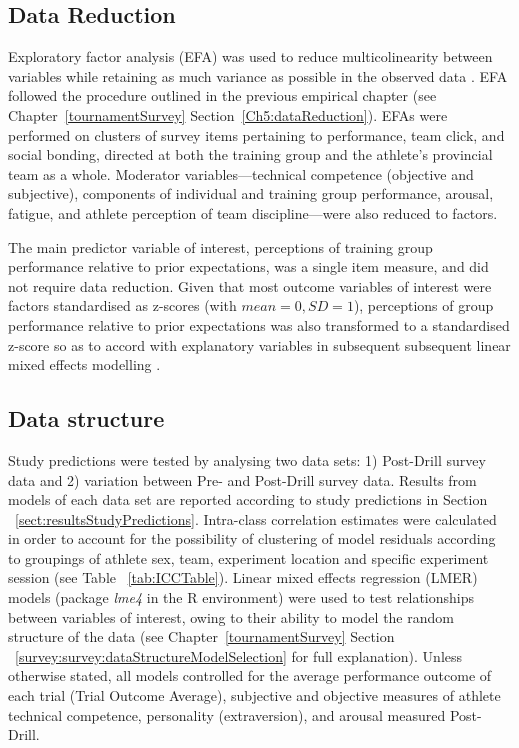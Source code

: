 \subsection{Data Reduction}
Exploratory factor analysis (EFA) was used to reduce multicolinearity between variables while retaining as much variance as possible in the observed data \citep[, see Appendix~\ref{app5:EFA}]{Yong2013}. EFA followed the procedure outlined in the previous empirical chapter (see Chapter~\ref{tournamentSurvey} Section~\ref{Ch5:dataReduction}).
EFAs were performed on clusters of survey items pertaining to performance, team click, and social bonding, directed at both the training group and the athlete's provincial team as a whole.  Moderator variables---technical competence (objective and subjective), components of individual and training group performance, arousal, fatigue, and athlete perception of team discipline---were also reduced to factors.


The main predictor variable of interest, perceptions of training group performance relative to prior expectations, was a single item measure, and did not require data reduction.  Given that most outcome variables of interest were factors standardised as z-scores (with $mean = 0, SD = 1$), perceptions of group performance relative to prior expectations was also transformed to a standardised z-score so as to accord with explanatory variables in subsequent subsequent linear mixed effects modelling \citep[for an explanation, see, for example, ][1058]{Beckmann2003}.


\subsection{Data structure}
Study predictions were tested by analysing two data sets:  1) Post-Drill survey data and 2) variation between Pre- and Post-Drill survey data.  Results from models of each data set are reported according to study predictions in Section ~\ref{sect:resultsStudyPredictions}. Intra-class correlation estimates were calculated in order to account for the possibility of clustering of model residuals according to groupings of athlete sex, team, experiment location and specific experiment session (see Table ~\ref{tab:ICCTable}). Linear mixed effects regression (LMER) models (package \textit{lme4} in the R environment) were used to test relationships between variables of interest, owing to their ability to model the random structure of the data (see Chapter~\ref{tournamentSurvey} Section ~\ref{survey:survey:dataStructureModelSelection} for full explanation).  Unless otherwise stated, all models controlled for the average performance outcome of each trial (Trial Outcome Average), subjective and objective measures of athlete technical competence, personality (extraversion), and arousal measured Post-Drill.


